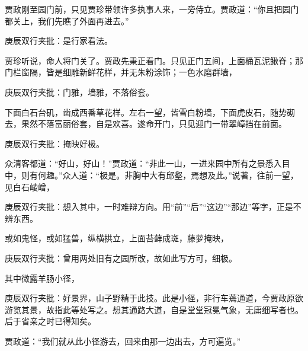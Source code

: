 \begin{parag}
    贾政刚至园门前，只见贾珍带领许多执事人来，一旁侍立。贾政道：“你且把园门都关上，我们先瞧了外面再进去。”\begin{note}庚辰双行夹批：是行家看法。\end{note}贾珍听说，命人将门关了。贾政先秉正看门。只见正门五间，上面桶瓦泥鳅脊；那门栏窗隔，皆是细雕新鲜花样，并无朱粉涂饰；一色水磨群墙，\begin{note}庚辰双行夹批：门雅，墙雅，不落俗套。\end{note}下面白石台矶，凿成西番草花样。左右一望，皆雪白粉墙，下面虎皮石，随势砌去，果然不落富丽俗套，自是欢喜。遂命开门，只见迎门一带翠嶂挡在前面。\begin{note}庚辰双行夹批：掩映好极。\end{note}众清客都道：“好山，好山！”贾政道：“非此一山，一进来园中所有之景悉入目中，则有何趣。”众人道：“极是。非胸中大有邱壑，焉想及此。”说著，往前一望，见白石崚嶒，\begin{note}庚辰双行夹批：想入其中，一时难辩方向。用“前”“后”“这边”“那边”等字，正是不辨东西。\end{note}或如鬼怪，或如猛兽，纵横拱立，上面苔藓成斑，藤萝掩映，\begin{note}庚辰双行夹批：曾用两处旧有之园所改，故如此写方可，细极。\end{note}其中微露羊肠小径，\begin{note}庚辰双行夹批：好景界，山子野精于此技。此是小径，非行车蔫通道，今贾政原欲游览其景，故指此等处写之。想其通路大道，自是堂堂冠冕气象，无庸细写者也。后于省亲之时已得知矣。\end{note}贾政道：“我们就从此小径游去，回来由那一边出去，方可遍览。”
\end{parag}


